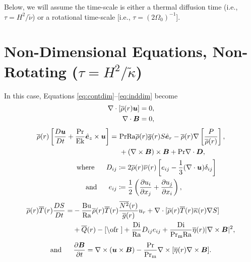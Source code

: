 \documentclass[12pt]{article}
\numberwithin{equation}{section}
\begin{document}
	Below, we will assume the time-scale is either a thermal diffusion time (i.e., $\tau=H^2/\tilde{\nu}$) or a rotational time-scale [i.e., $\tau=(2\Omega_0)^{-1}$]. %
	
	\section{Non-Dimensional Equations, Non-Rotating ($\tau=H^2/\tilde{\kappa}$)}
	In this case, Equations \eqref{eq:contdim}--\eqref{eq:inddim} become 
	\begin{align}
	\nabla\cdot[\overline{\rho}(r)\bm{u}] &= 0\label{eq:contndvisc},\\
	\nabla\cdot \bm{B} &= 0,
\end{align}
\begin{subequations}\label{eq:momndvisc}
	\begin{align}
		\overline{\rho}(r)\left[\frac{D\bm{u}}{Dt}+\frac{{\rm{Pr}}}{{\rm{Ek}}}\hat{\bm{e}}_z\times\bm{u}\right] = &\ {\rm{Pr}}{\rm{Ra}}\overline{\rho}(r)\overline{g}(r) S\hat{\bm{e}}_r         -\overline{\rho}(r)\nabla\left[ \frac{P}{\overline{\rho}(r)} \right], \nonumber\\
		&\ +(\nabla\times\bm{B})\times\bm{B} +{\rm{Pr}}\nabla\cdot\bm{D},\\
		\text{where}\ \ \ \ \  D_{ij} &\coloneqq 2\overline{\rho}(r)\overline{\nu}(r) \left[e_{ij} - \frac{1}{3}(\nabla\cdot\bm{u}) \delta_{ij} \right]\\
		\text{and}\ \ \ \ \  e_{ij} &\coloneqq \frac{1}{2}\left(\frac{\partial u_i}{\partial x_j} + \frac{\partial u_j}{\partial x_i} \right),
	\end{align}
\end{subequations}
\begin{align}\label{eq:enndvisc}
	\rhoref\ofr\tmpref\ofr \matderiv{S} = & - \frac{\bu}{\ra}\rhoref\ofr\tmpref\ofr \frac{\nsqref\ofr}{\gref\ofr} u_r  + \Div[\rhoref\ofr \tmpref\ofr \kapparef\ofr \nabla S] \nonumber \\
	&+ \qref(r) -\cref\ofr + \frac{\di}{\ra} D_{ij}e_{ij} + \frac{\di}{\prm\ra} \etaref\ofr|\curl\vecb|^2,
\end{align}
\begin{align}\label{eq:indndvisc}
	\text{and}\ \ \ \ \  \frac{\partial\bm{B}}{\partial t} = \nabla\times(\bm{u}\times\bm{B}) - \frac{{\rm{Pr}}}{{\rm{Pr_m}}} \nabla\times[\overline{\eta}(r)\nabla\times\bm{B}].
\end{align}	
\end{document}
